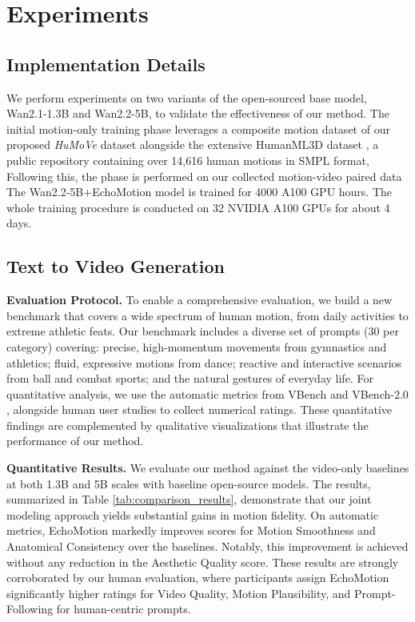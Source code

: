 \section{Experiments}
\subsection{Implementation Details}



We perform experiments on two variants of the open-sourced base model, Wan2.1-1.3B and Wan2.2-5B, to validate the effectiveness of our method. 
The initial motion-only training phase leverages a composite motion dataset of our proposed \textit{HuMoVe} dataset alongside the extensive HumanML3D dataset \citep{guo2022generating}, a public repository containing over 14,616 human motions in SMPL format,  Following this, the  phase is performed on our collected motion-video paired data  The Wan2.2-5B+EchoMotion model is trained for 4000 A100 GPU hours.
The whole training procedure is conducted on 32 NVIDIA A100 GPUs for about 4 days.



\subsection{Text to Video Generation}
\textbf{Evaluation Protocol.}
To enable a comprehensive evaluation, we build a new benchmark that covers a wide spectrum of human motion, from daily activities to extreme athletic feats. Our benchmark includes a diverse set of prompts (30 per category) covering: precise, high-momentum movements from gymnastics and athletics; fluid, expressive motions from dance; reactive and interactive scenarios from ball and combat sports; and the natural gestures of everyday life. 
For quantitative analysis, we use the automatic metrics from VBench \citep{huang2024vbench} and VBench-2.0 \citep{zheng2025vbench}, alongside human user studies to collect numerical ratings. These quantitative findings are complemented by qualitative visualizations that illustrate the performance of our method.


\textbf{Quantitative Results.}
We evaluate our method against the video-only baselines at both 1.3B and 5B scales with baseline open-source models. The results, summarized in Table \ref{tab:comparison_results}, demonstrate that our joint modeling approach yields substantial gains in motion fidelity. On automatic metrics, EchoMotion markedly improves scores for Motion Smoothness and Anatomical Consistency over the baselines. Notably, this improvement is achieved without any reduction in the Aesthetic Quality score.
These results are strongly corroborated by our human evaluation, where participants assign EchoMotion significantly higher ratings for Video Quality, Motion Plausibility, and Prompt-Following for human-centric prompts.


